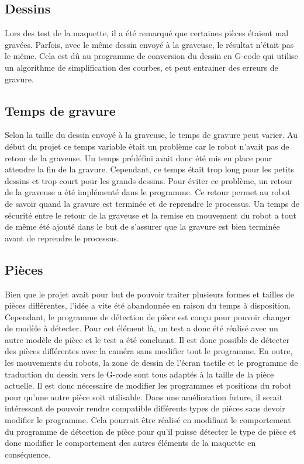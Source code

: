\subsection{Dessins}
Lors des test de la maquette, il a été remarqué que certaines pièces étaient mal gravées. Parfois, avec le même dessin envoyé à la graveuse, le résultat n'était pas le même. Cela est dû au programme de conversion du dessin en G-code qui utilise un algorithme de simplification des courbes, et peut entrainer des erreurs de gravure.

\subsection{Temps de gravure}
Selon la taille du dessin envoyé à la graveuse, le temps de gravure peut varier. Au début du projet ce temps variable était un problème car le robot n'avait pas de retour de la graveuse. Un temps prédéfini avait donc été mis en place pour attendre la fin de la gravure. Cependant, ce temps était trop long pour les petits dessins et trop court pour les grands dessins. Pour éviter ce problème, un retour de la graveuse a été implémenté dans le programme. Ce retour permet au robot de savoir quand la gravure est terminée et de reprendre le processus. Un temps de sécurité entre le retour de la graveuse et la remise en mouvement du robot a tout de même été ajouté dans le but de s'assurer que la gravure est bien terminée avant de reprendre le processus.

\subsection{Pièces}
Bien que le projet avait pour but de pouvoir traiter plusieurs formes et tailles de pièces différentes, l'idée a vite été abandonnée en raison du temps à disposition. Cependant, le programme de détection de pièce est conçu pour pouvoir changer de modèle à détecter. Pour cet élément là, un test a donc été réalisé avec un autre modèle de pièce et le test a été concluant. Il est donc possible de détecter des pièces différentes avec la caméra sans modifier tout le programme. En outre, les mouvements du robots, la zone de dessin de l'écran tactile et le programme de traduction du dessin vers le G-code sont tous adaptés à la taille de la pièce actuelle. Il est donc nécessaire de modifier les programmes et positions du robot pour qu'une autre pièce soit utilisable. Dans une amélioration future, il serait intéressant de pouvoir rendre compatible différents types de pièces sans devoir modifier le programme. Cela pourrait être réalisé en modifiant le comportement du programme de détection de pièce pour qu'il puisse détecter le type de pièce et donc modifier le comportement des autres éléments de la maquette en conséquence.

